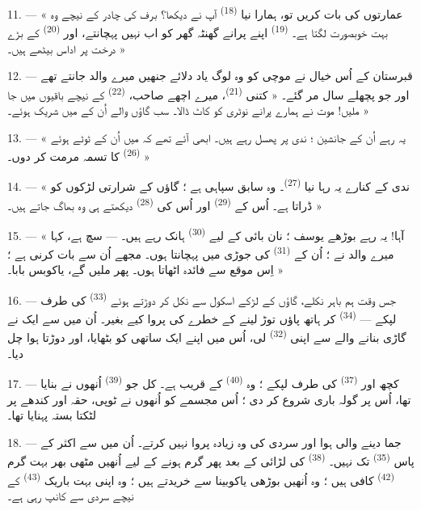 11. --- « عمارتوں کی بات کریں تو، ہمارا نیا 
\textsuperscript{(18)} آپ نے دیکھا؟ برف کی چادر کے نیچے وہ بہت
خوبصورت لگتا ہے۔  \textsuperscript{(19)} اپنے پرانے گھنٹہ
گھر کو اب نہیں پہچانتے، اور  \textsuperscript{(20)}
کے بڑے درخت پر اداس بیٹھے ہیں۔ »

12. --- قبرستان کے اُس خیال نے موچی کو وہ لوگ یاد دلائے جنھیں میرے
والد جانتے تھے اور جو پچھلے سال مر گئے۔ « کتنی 
\textsuperscript{(21)}، میرے اچھے صاحب، 
\textsuperscript{(22)} کے نیچے باقیوں میں جا ملیں! موت نے ہمارے پرانے
نوٹری کو کاٹ ڈالا۔ سب گاؤں والے اُن کے  میں شریک
ہوئے۔ »

13. --- « یہ رہے اُن کے جانشین ؛ ندی پر پھسل رہے ہیں۔ ابھی آئے تھے
کہ میں اُن کے ٹوٹے ہوئے  \textsuperscript{(26)}
کا تسمہ مرمت کر دوں۔ »

14. --- « ندی کے کنارے یہ رہا نیا 
\textsuperscript{(27)}۔ وہ سابق سپاہی ہے ؛ گاؤں کے شرارتی لڑکوں کو
ڈراتا ہے۔ اُس کے  \textsuperscript{(29)} اور اُس کی
 \textsuperscript{(28)} دیکھتے ہی وہ بھاگ جاتے
ہیں۔ »

15. --- « آہا! یہ رہے بوڑھے یوسف ؛ نان بائی کے لیے  \textsuperscript{(30)} ہانک رہے ہیں۔ --- سچ ہے،
کہا میرے والد نے ؛ اُن کے  \textsuperscript{(31)} کی
جوڑی میں پہچانتا ہوں۔ مجھے اُن سے بات کرنی ہے ؛ اِس موقع سے فائدہ
اٹھاتا ہوں۔ پھر ملیں گے، یاکوبس بابا۔ »

16. --- جس وقت ہم باہر نکلے، گاؤں کے لڑکے اسکول سے نکل کر دوڑتے ہوئے
 \textsuperscript{(33)} کی طرف لپکے — 
\textsuperscript{(34)} کر ہاتھ پاؤں توڑ لینے کے خطرے کی پروا کیے
بغیر۔ اُن میں سے ایک نے گاڑی بنانے والے سے اپنی 
\textsuperscript{(32)} لی، اُس میں اپنے ایک ساتھی کو بٹھایا، اور
دوڑتا ہوا چل دیا۔

17. --- کچھ اور  \textsuperscript{(37)} کی طرف
لپکے ؛ وہ  \textsuperscript{(40)} کے قریب ہے۔ کل جو
 \textsuperscript{(39)} اُنھوں نے بنایا تھا، اُس
پر گولہ باری شروع کر دی ؛ اُس مجسمے کو اُنھوں نے ٹوپی، حقہ اور کندھے
پر لٹکتا بستہ پہنایا تھا۔

18. --- جما دینے والی ہوا اور سردی کی وہ زیادہ پروا نہیں کرتے۔ اُن
میں سے اکثر کے پاس  \textsuperscript{(35)} تک نہیں۔
 \textsuperscript{(38)} کی لڑائی کے بعد پھر گرم
ہونے کے لیے اُنھیں مٹھی بھر بہت گرم 
\textsuperscript{(42)} کافی ہیں ؛ وہ اُنھیں بوڑھی 
یاکوبینا سے خریدتے ہیں ؛ وہ اپنی بہت باریک 
\textsuperscript{(43)} کے نیچے سردی سے کانپ رہی ہے۔


